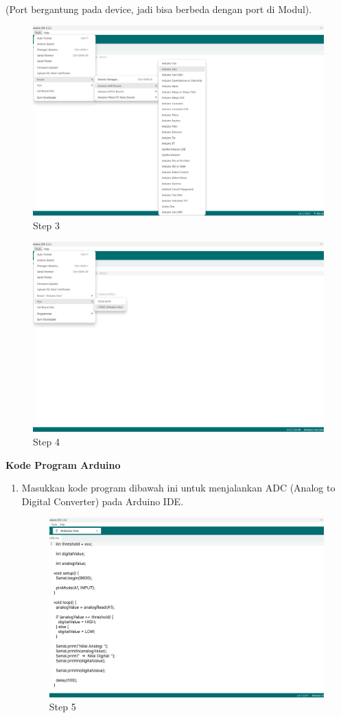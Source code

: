 \begin{center}
\begin{enumerate}
		\\(Port bergantung pada device, jadi bisa berbeda dengan port di Modul).
		\begin{figure}[H]
			\centering
			\includegraphics[width=0.8\linewidth]{P2/img/per1/step 3.png}
			\caption{Step 3}
			\label{fig:Step 3(Step 3)}
		\end{figure}

		\begin{figure}[H]
			\centering
			\includegraphics[width=0.8\linewidth]{P2/img/per1/step 4.png}
			\caption{Step 4}
			\label{fig:Step 4(Step 4)}
		\end{figure}

	\end{enumerate}

	\textbf{Kode Program Arduino}
	\begin{enumerate}
		\item Masukkan kode program dibawah ini untuk menjalankan ADC (Analog to Digital Converter) pada Arduino IDE.
		\begin{figure}[H]
			\centering
			\includegraphics[width=0.8\linewidth]{P2/img/per1/step 5.png}
			\caption{Step 5}
			\label{fig:Step 5(Step 5)}
		\end{figure}


\end{enumerate}
\end{center}
